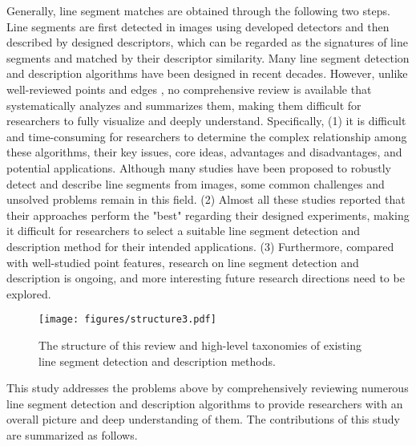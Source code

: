 \documentclass[journal,compsoc]{IEEEtran}
\begin{document}
Generally, line segment matches are obtained through the following two steps. Line segments are first detected in images using developed detectors and then described by designed descriptors, which can be regarded as the signatures of line segments and matched by their descriptor similarity. Many line segment detection and description algorithms have been designed in recent decades. However, unlike well-reviewed points \cite{TPAMI_Interest_Point_Survey,LI2015736,10.1007/s11263-020-01359-2} and edges \cite{JING2022259,10.3389/frsip.2022.826967,1097737}, no comprehensive review is available that systematically analyzes and summarizes them, making them difficult for researchers to fully visualize and deeply understand. Specifically, (1) it is difficult and  time-consuming for researchers to determine the complex relationship among these algorithms, their key issues, core ideas, advantages and disadvantages, and potential applications. Although many studies have been proposed to robustly detect and describe line segments from images, some common challenges and unsolved problems remain in this field. (2) Almost all these studies reported that their approaches perform the "best" regarding their designed experiments, making it difficult for researchers to select a suitable line segment detection and description method for their intended applications. (3) Furthermore, compared with well-studied point features, research on line segment detection and description is ongoing, and more interesting future research directions need to be explored.

\begin{figure*}[tbp]
	\centering
	\texttt{[image: figures/structure3.pdf]}
	\caption{The structure of this review and high-level taxonomies of existing line segment detection and description methods.}
	\label{line_segment_taxonomy}
\end{figure*}

This study addresses the problems above by comprehensively reviewing numerous line segment detection and description algorithms to provide researchers with an overall picture and deep understanding of them. The contributions of this study are summarized as follows.
\end{document}
